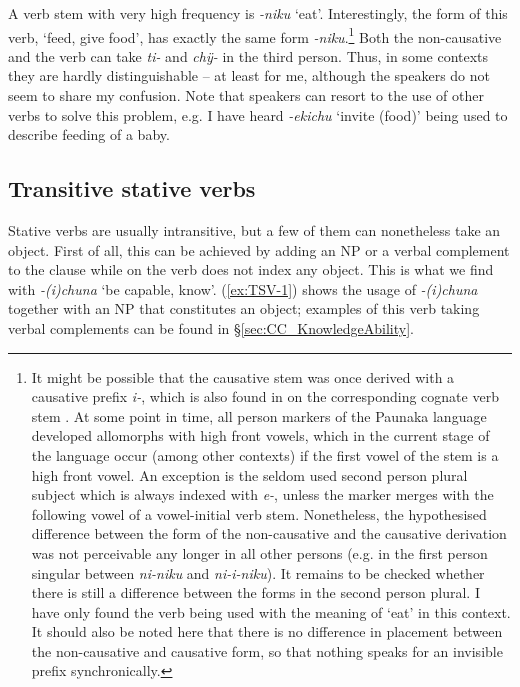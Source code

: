 A verb stem with very high frequency is \textit{-niku} ‘eat’. Interestingly, the  form of this verb, ‘feed, give food’, has exactly the same form \textit{-niku}.\footnote{It might be possible that the causative stem was once derived with a causative prefix \textit{i-}, which is also found in  on the corresponding cognate verb stem \citep[cf.][291, Footnote 11]{Danielsen2014a}. At some point in time, all person markers of the Paunaka language developed allomorphs with high front vowels, which in the current stage of the language occur (among other contexts) if the first vowel of the stem is a high front vowel. An exception is the seldom used second person plural subject which is always indexed with \textit{e-}, unless the marker merges with the following vowel of a vowel-initial verb stem. Nonetheless, the hypothesised difference between the form of the non-causative and the causative derivation was not perceivable any longer in all other persons (e.g. in the first person singular between \mbox{\textit{ni-niku}} and \textit{ni-i-niku}). It remains to be checked whether there is still a difference between the forms in the second person plural. I have only found the verb being used with the meaning of ‘eat’ in this context. It should also be noted here that there is no difference in  placement between the non-causative and causative form, so that nothing speaks for an invisible prefix synchronically.} 
Both the non-causative and the  verb can take \textit{ti-} and \textit{chÿ-} in the third person. Thus, in some contexts they are hardly distinguishable – at least for me, although the speakers do not seem to share my confusion. Note that speakers can resort to the use of other verbs to solve this problem, e.g. I have heard \textit{-ekichu} ‘invite (food)’ being used to describe feeding of a baby.

\subsection{Transitive stative verbs}\label{sec:TransitiveStativeV} 

Stative verbs are usually intransitive, but a few of them can nonetheless take an object. First of all, this can be achieved by adding an NP or a verbal complement to the clause while  on the verb does not index any object. This is what we find with \textit{-(i)chuna} ‘be capable, know’. (\ref{ex:TSV-1}) shows the usage of \textit{-(i)chuna} together with an NP that constitutes an object; examples of this verb taking verbal complements can be found in §\ref{sec:CC_KnowledgeAbility}.

